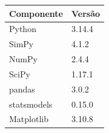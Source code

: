 \begin{tabular}{ll}
\toprule
Componente & Versão \\
\midrule
Python & 3.14.4 \\
SimPy & 4.1.2 \\
NumPy & 2.4.4 \\
SciPy & 1.17.1 \\
pandas & 3.0.2 \\
statsmodels & 0.15.0 \\
Matplotlib & 3.10.8 \\
\bottomrule
\end{tabular}
